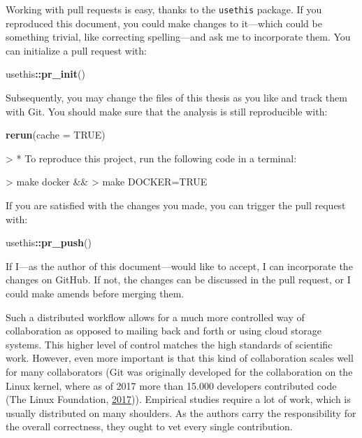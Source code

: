 \documentclass[12pt,a4paper,twoside]{article}
\newenvironment{Shaded}{\begin{snugshade}}{\end{snugshade}}
\newcommand{\DataTypeTok}[1]{\textcolor[rgb]{0.13,0.29,0.53}{#1}}
\newcommand{\KeywordTok}[1]{\textcolor[rgb]{0.13,0.29,0.53}{\textbf{#1}}}
\newcommand{\NormalTok}[1]{#1}
\newcommand{\OperatorTok}[1]{\textcolor[rgb]{0.81,0.36,0.00}{\textbf{#1}}}
\newcommand{\OtherTok}[1]{\textcolor[rgb]{0.56,0.35,0.01}{#1}}
\let\oldverbatim\verbatim
\let\endoldverbatim\endverbatim
\renewenvironment{verbatim}{\footnotesize\oldverbatim}{\endoldverbatim}
\begin{document}
Working with pull requests is easy, thanks to the \texttt{usethis} package.
If you reproduced this document, you could make changes to it---which could be something trivial, like correcting spelling---and ask me to incorporate them.
You can initialize a pull request with:

\begin{Shaded}
\begin{Highlighting}[]
\NormalTok{usethis}\OperatorTok{::}\KeywordTok{pr_init}\NormalTok{()}
\end{Highlighting}
\end{Shaded}

Subsequently, you may change the files of this thesis as you like and track them with Git.
You should make sure that the analysis is still reproducible with:

\begin{Shaded}
\begin{Highlighting}[]
\KeywordTok{rerun}\NormalTok{(}\DataTypeTok{cache =} \OtherTok{TRUE}\NormalTok{)}
\end{Highlighting}
\end{Shaded}

\begin{verbatim}
> * To reproduce this project, run the following code in a terminal:
\end{verbatim}

\begin{verbatim}
>   make docker &&
>   make DOCKER=TRUE
\end{verbatim}

If you are satisfied with the changes you made, you can trigger the pull request with:

\begin{Shaded}
\begin{Highlighting}[]
\NormalTok{usethis}\OperatorTok{::}\KeywordTok{pr_push}\NormalTok{()}
\end{Highlighting}
\end{Shaded}

If I---as the author of this document---would like to accept, I can incorporate the changes on GitHub.
If not, the changes can be discussed in the pull request, or I could make amends before merging them.

Such a distributed workflow allows for a much more controlled way of collaboration as opposed to mailing back and forth or using cloud storage systems.
This higher level of control matches the high standards of scientific work.
However, even more important is that this kind of collaboration scales well for many collaborators (Git was originally developed for the collaboration on the Linux kernel, where as of 2017 more than 15.000 developers contributed code (The Linux Foundation, \protect\hyperlink{ref-thelinuxfoundation2017LinuxKernel2017}{2017})).
Empirical studies require a lot of work, which is usually distributed on many shoulders.
As the authors carry the responsibility for the overall correctness, they ought to vet every single contribution.
\end{document}
